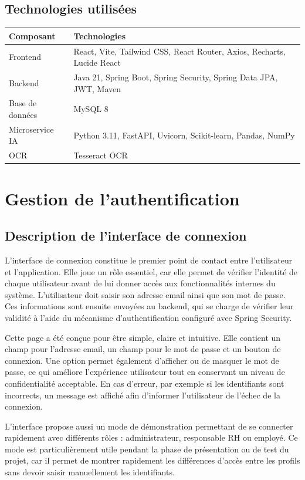 \documentclass[12pt,a4paper]{report}
\begin{document}
\section{Technologies utilisées}

\begin{longtable}{|p{4cm}|p{10cm}|}
\hline
\textbf{Composant} & \textbf{Technologies} \\
\hline
Frontend & React, Vite, Tailwind CSS, React Router, Axios, Recharts, Lucide React \\
\hline
Backend & Java 21, Spring Boot, Spring Security, Spring Data JPA, JWT, Maven \\
\hline
Base de données & MySQL 8 \\
\hline
Microservice IA & Python 3.11, FastAPI, Uvicorn, Scikit-learn, Pandas, NumPy \\
\hline
OCR & Tesseract OCR \\
\hline
\end{longtable}

\chapter{Gestion de l'authentification}

\section{Description de l'interface de connexion}

L'interface de connexion constitue le premier point de contact entre l'utilisateur et l'application. Elle joue un rôle essentiel, car elle permet de vérifier l'identité de chaque utilisateur avant de lui donner accès aux fonctionnalités internes du système. L'utilisateur doit saisir son adresse email ainsi que son mot de passe. Ces informations sont ensuite envoyées au backend, qui se charge de vérifier leur validité à l'aide du mécanisme d'authentification configuré avec Spring Security.

Cette page a été conçue pour être simple, claire et intuitive. Elle contient un champ pour l'adresse email, un champ pour le mot de passe et un bouton de connexion. Une option permet également d'afficher ou de masquer le mot de passe, ce qui améliore l'expérience utilisateur tout en conservant un niveau de confidentialité acceptable. En cas d'erreur, par exemple si les identifiants sont incorrects, un message est affiché afin d'informer l'utilisateur de l'échec de la connexion.

L'interface propose aussi un mode de démonstration permettant de se connecter rapidement avec différents rôles : administrateur, responsable RH ou employé. Ce mode est particulièrement utile pendant la phase de présentation ou de test du projet, car il permet de montrer rapidement les différences d'accès entre les profils sans devoir saisir manuellement les identifiants.
\end{document}
